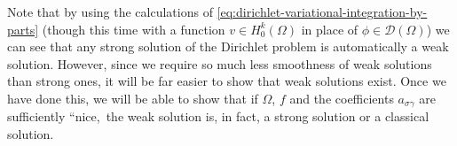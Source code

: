 Note that by using the calculations of \eqref{eq:dirichlet-variational-integration-by-parts} (though this time with a function $v\in H_0^k(\Omega)$ in place of $\phi\in\mathcal{D}(\Omega)$) we can see that any strong solution of the Dirichlet problem is automatically a weak solution. However, since we require so much less smoothness of weak solutions than strong ones, it will be far easier to show that weak solutions exist. Once we have done this, we will be able to show that if $\Omega$, $f$ and the coefficients $a_{\sigma\gamma}$ are sufficiently ``nice,\textquotesingle\textquotesingle\ the weak solution is, in fact, a strong solution or a classical solution.
